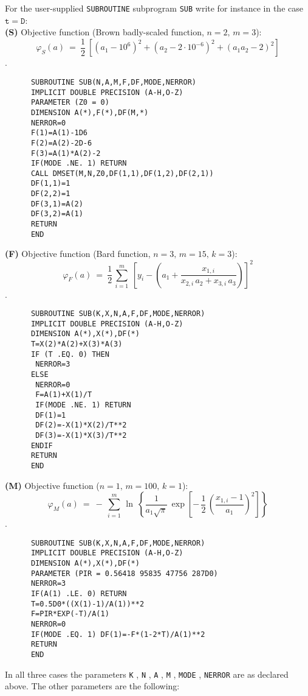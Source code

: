 \newpage
\Examples
For the user-supplied {\tt SUBROUTINE} subprogram {\tt SUB} write for
instance in the case $\mathtt{t = D}$: \\
 
{\bf (S)} Objective function (Brown badly-scaled function, $n=2,\,m=3$):
$$ \varphi_S(a) \ = \ \frac{1}{2} \:
\left[(a_1-10^6)^2+(a_2-2\cdot 10^{-6})^2+(a_1a_2-2)^2 \right] $$ .
\begin{verbatim}
      SUBROUTINE SUB(N,A,M,F,DF,MODE,NERROR)
      IMPLICIT DOUBLE PRECISION (A-H,O-Z)
      PARAMETER (Z0 = 0)
      DIMENSION A(*),F(*),DF(M,*)
      NERROR=0
      F(1)=A(1)-1D6
      F(2)=A(2)-2D-6
      F(3)=A(1)*A(2)-2
      IF(MODE .NE. 1) RETURN
      CALL DMSET(M,N,Z0,DF(1,1),DF(1,2),DF(2,1))
      DF(1,1)=1
      DF(2,2)=1
      DF(3,1)=A(2)
      DF(3,2)=A(1)
      RETURN
      END
\end{verbatim}
 
{\bf (F)} Objective function (Bard function, $n=3,\,m=15,\,k=3$):
$$ \varphi_F(a) \ = \ \frac{1}{2} \, \sum_{i=1}^m \:
\left[y_i - \left(a_1+ \frac{x_{1,i}}{x_{2,i}\,a_2+x_{3,i}\,a_3}\right)
\right]^2 $$ .
\begin{verbatim}
      SUBROUTINE SUB(K,X,N,A,F,DF,MODE,NERROR)
      IMPLICIT DOUBLE PRECISION (A-H,O-Z)
      DIMENSION A(*),X(*),DF(*)
      T=X(2)*A(2)+X(3)*A(3)
      IF (T .EQ. 0) THEN
       NERROR=3
      ELSE
       NERROR=0
       F=A(1)+X(1)/T
       IF(MODE .NE. 1) RETURN
       DF(1)=1
       DF(2)=-X(1)*X(2)/T**2
       DF(3)=-X(1)*X(3)/T**2
      ENDIF
      RETURN
      END
\end{verbatim}
 
\newpage
{\bf (M)} Objective function ($n=1,\,m=100,\,k=1$):
$$ \varphi_M(a) \ = \ -\:\sum_{i=1}^m\, \ln \: \left\{
\frac{1}{a_1\sqrt{\pi}} \, \exp \left[- \,\frac{1}{2} \,
\left(\frac{x_{1,i}-1}{a_1} \right)^2 \right] \right\} $$ .
\begin{verbatim}
      SUBROUTINE SUB(K,X,N,A,F,DF,MODE,NERROR)
      IMPLICIT DOUBLE PRECISION (A-H,O-Z)
      DIMENSION A(*),X(*),DF(*)
      PARAMETER (PIR = 0.56418 95835 47756 287D0)
      NERROR=3
      IF(A(1) .LE. 0) RETURN
      T=0.5D0*((X(1)-1)/A(1))**2
      F=PIR*EXP(-T)/A(1)
      NERROR=0
      IF(MODE .EQ. 1) DF(1)=-F*(1-2*T)/A(1)**2
      RETURN
      END
\end{verbatim}
 
In all three cases the parameters {\tt K} , {\tt N} ,
{\tt A} , {\tt M} , {\tt MODE} , {\tt NERROR} are as declared
above. The other parameters are the following:
 
